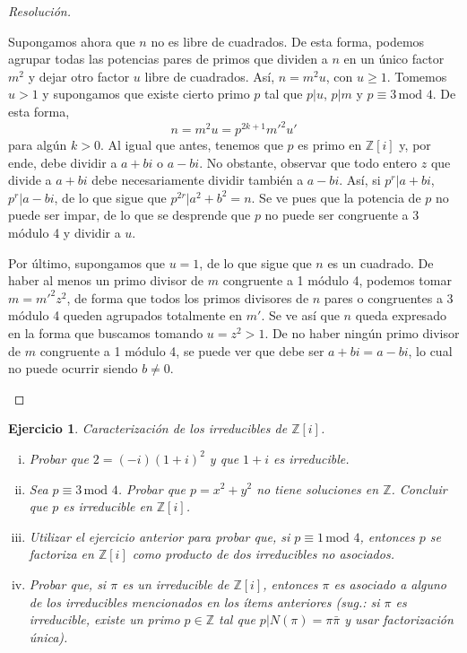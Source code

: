\documentclass[a4paper,11pt]{article}
\newcommand{\Zm}[1]{\ensuremath{\mathbb{Z}[#1]}}
\newcommand{\Cong}[3]{\ensuremath{#1 \equiv #2 \, \textrm{mod } #3}}
\newcommand{\Div}[2]{\ensuremath{#1 | #2}}
\newtheorem*{ej}{Ejercicio}
\begin{document}
\begin{proof}[Resoluci\'on]
\begin{enumerate}[i.]
Supongamos ahora que $n$ no es libre de cuadrados. De esta forma, podemos agrupar
todas las potencias pares de primos que dividen a $n$ en un único factor $m^2$ y
dejar otro factor $u$ libre de cuadrados. Así, $n = m^2 u$, con $u \geq 1$.
Tomemos $u > 1$ y supongamos que existe cierto primo $p$ tal que 
$\Div{p}{u}$, $\Div{p}{m}$ y \Cong{p}{3}{4}. De esta forma,
$$n = m^2 u = p^{2k+1} m'^2 u'$$
para algún $k > 0$. Al igual que antes, tenemos que $p$ es primo en \Zm{i} y, por ende,
debe dividir a $a+bi$ o $a - bi$. No obstante, observar que todo entero $z$ 
que divide a $a+bi$ debe necesariamente dividir también a $a-bi$. Así, si
\Div{p^r}{a+bi}, \Div{p^r}{a-bi}, de lo que sigue que \Div{p^{2r}}{a^2 + b^2 = n}.
Se ve pues que la potencia de $p$ no puede ser impar, de lo que se desprende que
$p$ no puede ser congruente a 3 módulo 4 y dividir a $u$.

Por último, supongamos que $u = 1$, de lo que sigue que $n$ es un cuadrado. De haber
al menos un primo divisor de $m$ congruente a 1 módulo 4, podemos tomar $m = m'^2 z^2$,
de forma que todos los primos divisores de $n$ pares o congruentes a 3 módulo 4
queden agrupados totalmente en $m'$. Se ve así que $n$ 
queda expresado en la forma que buscamos tomando $u = z^2 > 1$. 
De no haber ningún primo divisor de $m$ congruente a 1 módulo 4, se puede ver que debe
ser $a + bi = a - bi$, lo cual no puede ocurrir siendo $b \neq 0$.


\end{enumerate}

\end{proof}


\begin{ej} 
Caracterización de los irreducibles de \Zm{i}.

\begin{enumerate}[i.]
    \item  Probar que $2 = (-i)(1+i)^2$ y que $1+i$ es irreducible.

    \item Sea \Cong{p}{3}{4}. Probar que $p = x^2 + y^2$ no tiene soluciones
    en $\mathbb{Z}$. Concluir que $p$ es irreducible en \Zm{i}.

    \item Utilizar el ejercicio anterior para probar que, si \Cong{p}{1}{4}, entonces
    $p$ se factoriza en \Zm{i} como producto de dos irreducibles no asociados.

    \item Probar que, si $\pi$ es un irreducible de \Zm{i}, entonces $\pi$ es asociado
    a alguno de los irreducibles mencionados en los ítems anteriores (sug.: si $\pi$ es
    irreducible, existe un primo $p \in \mathbb{Z}$ tal que \Div{p}{N(\pi) = \pi \bar{\pi}}
    y usar factorización única).
\end{enumerate}
\end{ej}
\end{document}
